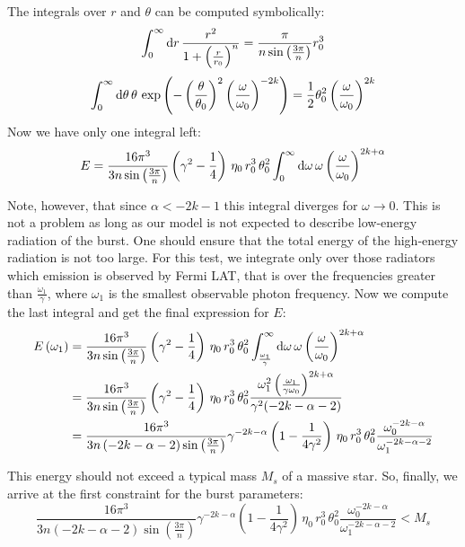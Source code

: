 \documentclass[manuscript]{aastex}
\begin{document}
The integrals over $r$ and $\theta$ can be computed symbolically:
\begin{equation*}
\int_0^\infty \dif r \, \frac{r^2}{1 + \left(\frac{r}{r_0}\right)^n} = \frac{\pi}{n\sin\left(\frac{3\pi}{n}\right)}r_0^3
\end{equation*}
\begin{equation*}
\int_0^\infty \dif \theta \, \theta \, \exp\left(-\left(\frac{\theta}{\theta_0}\right)^2\left(\frac{\omega}{\omega_0}\right)^{-2k}\right) = \frac{1}{2}\theta_0^2 \left(\frac{\omega}{\omega_0}\right)^{2k}
\end{equation*}
Now we have only one integral left:
\begin{equation}
E = \frac{16\pi^3}{3 n\sin\left(\frac{3\pi}{n}\right)} \left(\gamma^2 - \frac{1}{4}\right) \, \eta_0 \, r_0^3 \, \theta_0^2 \int_0^\infty \dif \omega \, \omega \left(\frac{\omega}{\omega_0}\right)^{2k+\alpha}
\end{equation}

Note, however, that since $\alpha < -2k-1$ this integral diverges for
$\omega \rightarrow 0$. This is not a problem as long as our model is
not expected to describe low-energy radiation of the burst. One should
ensure that the total energy of the high-energy radiation is not too
large. For this test, we integrate only over those radiators which
emission is observed by Fermi LAT, that is over the frequencies
greater than $\frac{\omega_1}{\gamma}$, where $\omega_1$ is the
smallest observable photon frequency. Now we compute the last integral
and get the final expression for $E$:
\begin{align}
E\left(\omega_1\right)
&= \frac{16\pi^3}{3 n\sin\left(\frac{3\pi}{n}\right)} \left(\gamma^2 - \frac{1}{4}\right) \, \eta_0 \, r_0^3 \, \theta_0^2 \int_{\frac{\omega_1}{\gamma}}^\infty \dif \omega \, \omega \left(\frac{\omega}{\omega_0}\right)^{2k+\alpha} \nonumber\\
&= \frac{16\pi^3}{3 n\sin\left(\frac{3\pi}{n}\right)} \left(\gamma^2 - \frac{1}{4}\right) \, \eta_0 \, r_0^3 \, \theta_0^2 \frac{\omega_1^2 \left(\frac{\omega_1}{\gamma \omega_0}\right)^{2k+\alpha}}{\gamma ^2 (-2k-\alpha-2)} \nonumber\\
&= \frac{16\pi^3}{3 n\left(-2k-\alpha-2\right)\sin\left(\frac{3\pi}{n}\right)} \gamma^{-2k-\alpha} \left(1 - \frac{1}{4\gamma^2}\right) \, \eta_0 \, r_0^3 \, \theta_0^2 \frac{\omega_0^{-2k-\alpha}}{\omega_1^{-2k-\alpha-2}}
\end{align}

This energy should not exceed a typical mass $M_s$ of a massive
star. So, finally, we arrive at the first constraint for the burst
parameters:
\begin{equation}
\frac{16\pi^3}{3 n\left(-2k-\alpha-2\right)\sin\left(\frac{3\pi}{n}\right)} \gamma^{-2k-\alpha} \left(1 - \frac{1}{4\gamma^2}\right) \, \eta_0 \, r_0^3 \, \theta_0^2 \frac{\omega_0^{-2k-\alpha}}{\omega_1^{-2k-\alpha-2}} < M_s
\end{equation}
\end{document}
